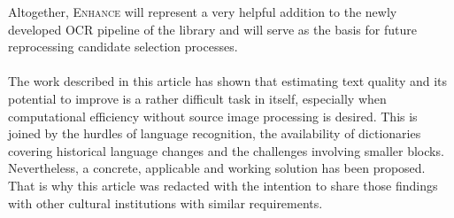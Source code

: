 \documentclass{jdmdh}
\begin{document}
Altogether, \textsc{Enhance} will represent a very helpful addition to the newly developed OCR pipeline of the library and will serve as the basis for future reprocessing candidate selection processes.
\\ \\
The work described in this article has shown that estimating text quality and its potential to improve is a rather difficult task in itself, especially when computational efficiency without source image processing is desired. This is joined by the hurdles of language recognition, the availability of dictionaries covering historical language changes and the challenges involving smaller blocks. Nevertheless, a concrete, applicable and working solution has been proposed. That is why this article was redacted with the intention to share those findings with other cultural institutions with similar requirements.
\newpage


\end{document}
